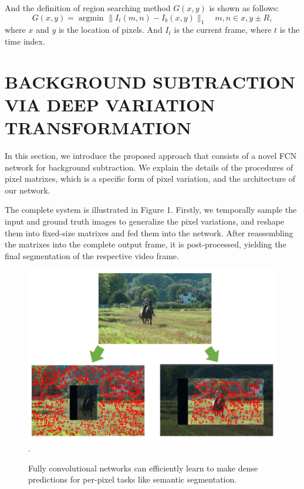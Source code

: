 \documentclass[journal]{IEEEtran}
\DeclareMathOperator*{\argmin}{argmin}
\begin{document}
And the definition of region searching method $G(x,y)$ is shown as follows:
\begin{equation}
    G(x,y) =  \mathop{\argmin}_{}{ \lVert I_t(m,n) - I_b(x,y) \rVert_{1}  } \quad  m,n \in x,y \pm R,
\end{equation}
where $x$ and $y$ is the location of pixels. And $I_t$ is the current frame, where $t$ is the
time index.

\section{BACKGROUND SUBTRACTION VIA DEEP VARIATION TRANSFORMATION}
In this section, we introduce the proposed approach that consists of a novel FCN network for background subtraction. 
We explain the details of the procedures of pixel matrixes, which is a specific form of pixel variation, and the architecture of our network. 


The complete system is illustrated in Figure 1. 
Firstly, we temporally sample the input and ground truth images to generalize the pixel variations, and reshape them into fixed-size matrixes and fed them into the network. 
After reassembling the matrixes into the complete output frame, it is post-processed, yielding the final segmentation of the respective video frame.
\begin{figure}[!t]	%
\centering
\includegraphics[width=\textwidth]{figure/fig2}
\DeclareGraphicsExtensions.
    \caption{Fully convolutional networks can efficiently learn to make dense predictions for per-pixel tasks like semantic segmentation.}
    \label{flow_chart}
\end{figure}
\end{document}
